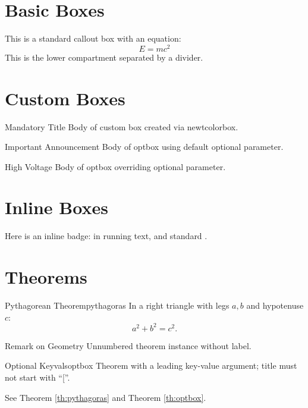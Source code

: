 \documentclass{article}
\begin{document}
\section{Basic Boxes}

\begin{tcolorbox}[colback=white, colframe=black, title=Standard Callout]
This is a standard callout box with an equation:
\begin{equation}
E = mc^2
\end{equation}
\tcblower
This is the lower compartment separated by a divider.
\end{tcolorbox}

\section{Custom Boxes}

\begin{mybox}{Mandatory Title}
Body of custom box created via newtcolorbox.
\end{mybox}

\begin{optbox}{Important Announcement}
Body of optbox using default optional parameter.
\end{optbox}

\begin{optbox}[Warning]{High Voltage}
Body of optbox overriding optional parameter.
\end{optbox}

\section{Inline Boxes}

Here is an inline badge:  in running text, and standard .

\section{Theorems}

\begin{theo}{Pythagorean Theorem}{pythagoras}
In a right triangle with legs $a, b$ and hypotenuse $c$:
\begin{equation}
a^2 + b^2 = c^2.
\end{equation}
\end{theo}

\begin{theo*}{Remark on Geometry}
Unnumbered theorem instance without label.
\end{theo*}

\begin{theo}[colback=blue!5!white]{Optional Keyvals}{optbox}
Theorem with a leading key-value argument; title must not start with ``[''.
\end{theo}

See Theorem \ref{th:pythagoras} and Theorem \ref{th:optbox}.
\end{document}
